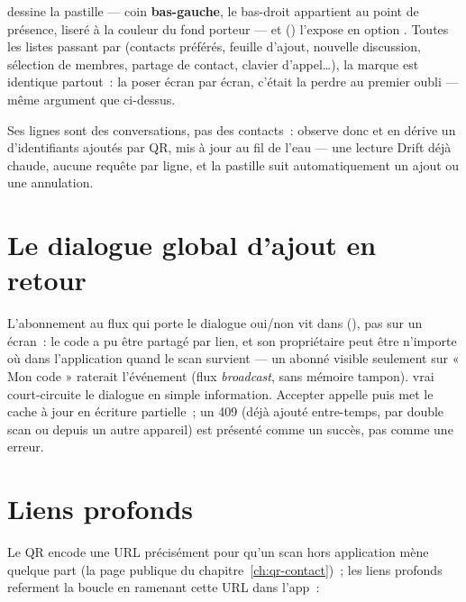  dessine la pastille --- coin \textbf{bas-gauche}, le
bas-droit appartient au point de présence, liseré à la couleur du fond porteur --- et
 ()
l'expose en option . Toutes les listes passant par 
(contacts préférés, feuille d'ajout, nouvelle discussion, sélection de membres, partage
de contact, clavier d'appel\ldots{}), la marque est identique partout~: la poser écran
par écran, c'était la perdre au premier oubli --- même argument que
 ci-dessus.

\begin{note}
Ses lignes sont des conversations, pas des contacts~:  observe
donc  et en dérive un  d'identifiants ajoutés
par QR, mis à jour au fil de l'eau --- une lecture Drift déjà chaude, aucune requête par
ligne, et la pastille suit automatiquement un ajout ou une annulation.
\end{note}

\section{Le dialogue global d'ajout en retour}

L'abonnement au flux  qui porte le dialogue oui/non vit dans
 (), pas sur un écran~: le code a pu être partagé par
lien, et son propriétaire peut être n'importe où dans l'application quand le scan
survient --- un abonné visible seulement sur « Mon code » raterait l'événement (flux
\emph{broadcast}, sans mémoire tampon).  vrai court-circuite le
dialogue en simple information. Accepter appelle 
puis met le cache à jour en écriture partielle~; un 409 (déjà ajouté entre-temps, par
double scan ou depuis un autre appareil) est présenté comme un succès, pas comme une
erreur.

\section{Liens profonds}
\label{sec:qr-liens}

Le QR encode une URL  précisément pour qu'un scan hors application mène
quelque part (la page publique du chapitre~\ref{ch:qr-contact})~; les liens profonds
referment la boucle en ramenant cette URL dans l'app~:

